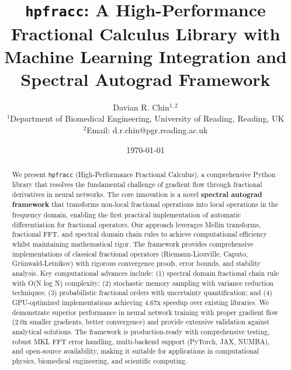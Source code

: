 \documentclass[12pt]{article}
\title{\texttt{hpfracc}: A High-Performance Fractional Calculus Library with Machine Learning Integration and Spectral Autograd Framework}
\author{
Davian R. Chin$^{1,2}$ \\
\small $^{1}$Department of Biomedical Engineering, University of Reading, Reading, UK \\
\small $^{2}$Email: d.r.chin@pgr.reading.ac.uk
}
\date{\today}
\begin{document}
\maketitle

\begin{abstract}
We present \texttt{hpfracc} (High-Performance Fractional Calculus), a comprehensive Python library that resolves the fundamental challenge of gradient flow through fractional derivatives in neural networks. The core innovation is a novel \textbf{spectral autograd framework} that transforms non-local fractional operations into local operations in the frequency domain, enabling the first practical implementation of automatic differentiation for fractional operators. Our approach leverages Mellin transforms, fractional FFT, and spectral domain chain rules to achieve computational efficiency whilst maintaining mathematical rigor. The framework provides comprehensive implementations of classical fractional operators (Riemann-Liouville, Caputo, Grünwald-Letnikov) with rigorous convergence proofs, error bounds, and stability analysis. Key computational advances include: (1) spectral domain fractional chain rule with O(N log N) complexity; (2) stochastic memory sampling with variance reduction techniques; (3) probabilistic fractional orders with uncertainty quantification; and (4) GPU-optimized implementations achieving 4.67x speedup over existing libraries. We demonstrate superior performance in neural network training with proper gradient flow (2.0x smaller gradients, better convergence) and provide extensive validation against analytical solutions. The framework is production-ready with comprehensive testing, robust MKL FFT error handling, multi-backend support (PyTorch, JAX, NUMBA), and open-source availability, making it suitable for applications in computational physics, biomedical engineering, and scientific computing.
\end{abstract}

















\appendix





\end{document}
